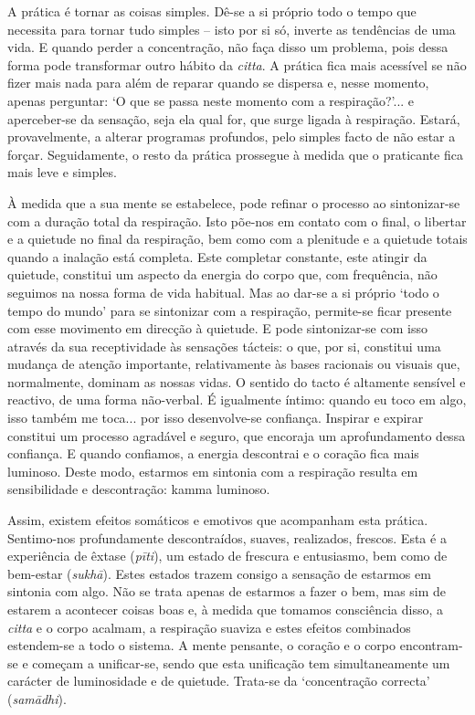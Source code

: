 A prática é tornar as coisas simples. Dê-se a si próprio todo o tempo que necessita para tornar tudo simples -- isto por si só, inverte as tendências de uma vida. E quando perder a concentração, não faça disso um problema, pois dessa forma pode transformar outro hábito da \emph{citta}. A prática fica mais acessível se não fizer mais nada para além de reparar quando se dispersa e, nesse momento, apenas perguntar: `O que se passa neste momento com a respiração?'... e aperceber-se da sensação, seja ela qual for, que surge ligada à respiração. Estará, provavelmente, a alterar programas profundos, pelo simples facto de não estar a forçar. Seguidamente, o resto da prática prossegue à medida que o praticante fica mais leve e simples.

À medida que a sua mente se estabelece, pode refinar o processo ao sintonizar-se com a duração total da respiração. Isto põe-nos em contato com o final, o libertar e a quietude no final da respiração, bem como com a plenitude e a quietude totais quando a inalação está completa. Este completar constante, este atingir da quietude, constitui um aspecto da energia do corpo que, com frequência, não seguimos na nossa forma de vida habitual. Mas ao dar-se a si próprio `todo o tempo do mundo' para se sintonizar com a respiração, permite-se ficar presente com esse movimento em direcção à quietude. E pode sintonizar-se com isso através da sua receptividade às sensações tácteis: o que, por si, constitui uma mudança de atenção importante, relativamente às bases racionais ou visuais que, normalmente, dominam as nossas vidas. O sentido do tacto é altamente sensível e reactivo, de uma forma não-verbal. É igualmente íntimo: quando eu toco em algo, isso também me toca... por isso desenvolve-se confiança. Inspirar e expirar constitui um processo agradável e seguro, que encoraja um aprofundamento dessa confiança. E quando confiamos, a energia descontrai e o coração fica mais luminoso. Deste modo, estarmos em sintonia com a respiração resulta em sensibilidade e descontração: kamma luminoso.

Assim, existem efeitos somáticos e emotivos que acompanham esta prática. Sentimo-nos profundamente descontraídos, suaves, realizados, frescos. Esta é a experiência de êxtase (\emph{pīti}), um estado de frescura e entusiasmo, bem como de bem-estar (\emph{sukhā}). Estes estados trazem consigo a sensação de estarmos em sintonia com algo. Não se trata apenas de estarmos a fazer o bem, mas sim de estarem a acontecer coisas boas e, à medida que tomamos consciência disso, a \emph{citta} e o corpo acalmam, a respiração suaviza e estes efeitos combinados estendem-se a todo o sistema. A mente pensante, o coração e o corpo encontram-se e começam a unificar-se, sendo que esta unificação tem simultaneamente um carácter de luminosidade e de quietude. Trata-se da `concentração correcta' (\emph{samādhi}).

